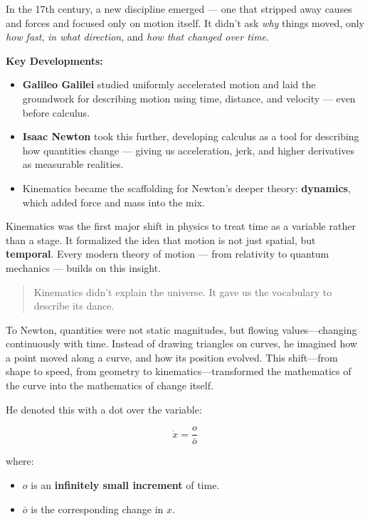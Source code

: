     \medskip
    
    In the 17th century, a new discipline emerged — one that stripped away causes and forces and focused only on motion itself. It didn’t ask \textit{why} things moved, only \textit{how fast}, \textit{in what direction}, and \textit{how that changed over time}.

    \textbf{Key Developments:}
    

    \begin{itemize}
      \item \textbf{Galileo Galilei} studied uniformly accelerated motion and laid the groundwork for describing motion using time, distance, and velocity — even before calculus.
      \item \textbf{Isaac Newton} took this further, developing calculus as a tool for describing how quantities change — giving us acceleration, jerk, and higher derivatives as measurable realities.
      \item Kinematics became the scaffolding for Newton’s deeper theory: \textbf{dynamics}, which added force and mass into the mix.
    \end{itemize}
    
    Kinematics was the first major shift in physics to treat time as a variable rather than a stage. It formalized the idea that motion is not just spatial, but \textbf{temporal}. Every modern theory of motion — from relativity to quantum mechanics — builds on this insight.
    
    \begin{quote}
    Kinematics didn’t explain the universe.  It gave us the vocabulary to describe its dance.
    \end{quote}

To Newton, quantities were not static magnitudes, but flowing values—changing continuously with time. Instead of drawing triangles on curves, he imagined how a point moved along a curve, and how its position evolved. This shift—from shape to speed, from geometry to kinematics—transformed the mathematics of the curve into the mathematics of change itself.

He denoted this with a dot over the variable:

\[
\dot{x} = \frac{o}{\bar{o}}
\]

where:

\begin{itemize}
    \item \( o \) is an \textbf{infinitely small increment} of time.  
    \item \( \bar{o} \) is the corresponding change in \( x \).
\end{itemize}


